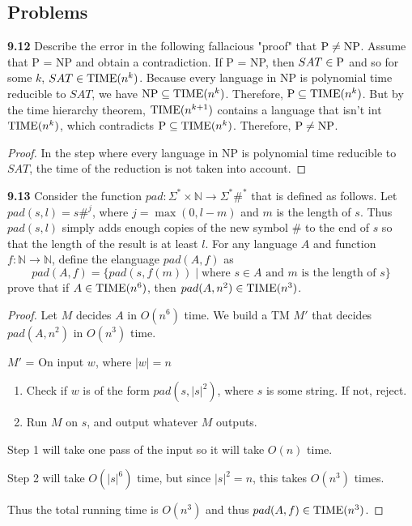 \subsection{Problems}
\textbf{9.12} Describe the error in the following fallacious "proof" that $\P \neq \NP$. Assume that P = NP and obtain a contradiction. If P = NP, then $SAT \in \P$ and so for some $k$, $SAT \in \TIME(n^k)$. Because every language in NP is polynomial time reducible to $SAT$, we have $\NP \subseteq \TIME(n^k)$. Therefore, $\P \subseteq \TIME(n^k)$. But by the time hierarchy theorem, $\TIME(n^{k+1})$ contains a language that isn't int $\TIME(n^k)$, which contradicts $\P \subseteq \TIME(n^k)$. Therefore, $\P \neq \NP$.
\begin{mdframed}
\begin{proof}
In the step where every language in NP is polynomial time reducible to $SAT$, the time of the reduction is not taken into account.
\end{proof}
\end{mdframed}

\textbf{9.13} Consider the function $pad: \Sigma^* \times \mathbb{N} \rightarrow \Sigma^*\#^*$ that is defined as follows. Let $pad(s, l) = s\#^j$, where $j = \max(0, l-m)$ and $m$ is the length of $s$. Thus $pad(s, l)$ simply adds enough copies of the new symbol $\#$ to the end of $s$ so that the length of the result is at least $l$. For any language $A$ and function $f: \mathbb{N} \rightarrow \mathbb{N}$, define the elanguage $pad(A, f)$ as 
\[
pad(A, f) = \{pad(s, f(m)) \mid \text{where $s \in A$ and $m$ is the length of $s$} \}
\]
prove that if $A \in \TIME(n^6)$, then $pad(A, n^2) \in \TIME(n^3)$.

\begin{mdframed}
\begin{proof}
Let $M$ decides $A$ in $O(n^6)$ time. We build a TM $M'$ that decides $pad(A, n^2)$ in $O(n^3)$ time.

\medskip
$M'$ = On input $w$, where $|w| = n$
\begin{enumerate}
\item Check if $w$ is of the form $pad(s, |s|^2)$, where $s$ is some string. If not, reject.
\item Run $M$ on $s$, and output whatever $M$ outputs.
\end{enumerate}

Step 1 will take one pass of the input so it will take $O(n)$ time.

Step 2 will take $O(|s|^6)$ time, but since $|s|^2 = n$, this takes $O(n^3)$ times.

Thus the total running time is $O(n^3)$ and thus $pad(A, f) \in \TIME(n^3)$.
\end{proof}
\end{mdframed}

